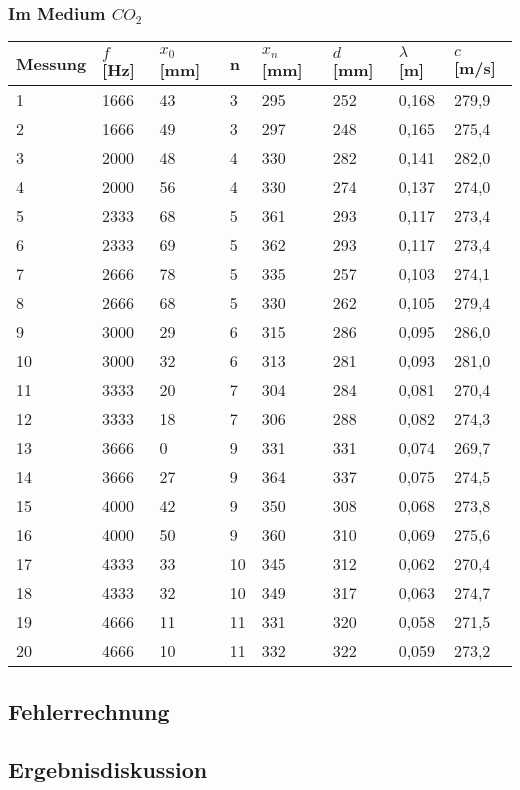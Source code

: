 \documentclass{scrartcl}
\begin{document}
\subsubsection{Im Medium $CO_{2}$}
\begin{table}[h]
\begin{tabular}{l|l|l|l|l|l|l|l}
Messung & $f$ {[}Hz{]} & $x_{0}$ [mm] & n & $x_{n}$ [mm] & $d$ [mm]   & $\lambda$ [m]      & $c$ [m/s]      \\
\hline
1       & 1666       & 43                & 3 & 295               & 252 & 0,168 & 279,9 \\
2       & 1666       & 49                & 3 & 297               & 248 & 0,165 & 275,4 \\
3       & 2000       & 48                & 4 & 330               & 282 & 0,141 & 282,0 \\
4       & 2000       & 56                & 4 & 330               & 274 & 0,137 & 274,0 \\
5       & 2333       & 68                & 5 & 361               & 293 & 0,117 & 273,4 \\
6       & 2333       & 69                & 5 & 362               & 293 & 0,117 & 273,4 \\
7       & 2666       & 78                & 5 & 335               & 257 & 0,103 & 274,1 \\
8       & 2666       & 68                & 5 & 330               & 262 & 0,105 & 279,4 \\
9       & 3000       & 29                & 6 & 315               & 286 & 0,095 & 286,0 \\
10      & 3000       & 32                & 6 & 313               & 281 & 0,093 & 281,0 \\
11      & 3333       & 20                & 7 & 304               & 284 & 0,081 & 270,4 \\
12      & 3333       & 18                & 7 & 306               & 288 & 0,082 & 274,3 \\
13      & 3666       &  0                & 9 & 331               & 331 & 0,074 & 269,7 \\
14      & 3666       & 27                & 9 & 364               & 337 & 0,075 & 274,5 \\
15      & 4000       & 42                & 9 & 350               & 308 & 0,068 & 273,8 \\
16      & 4000       & 50                & 9 & 360               & 310 & 0,069 & 275,6 \\
17      & 4333       & 33                & 10 & 345               & 312 & 0,062 & 270,4 \\
18      & 4333       & 32                & 10 & 349               & 317 & 0,063 & 274,7 \\
19      & 4666       & 11                & 11 & 331               & 320 & 0,058 & 271,5 \\
20      & 4666       & 10                & 11 & 332               & 322 & 0,059 & 273,2
\end{tabular}
\end{table}
\subsection{Fehlerrechnung}

\subsection{Ergebnisdiskussion}
\end{document}
